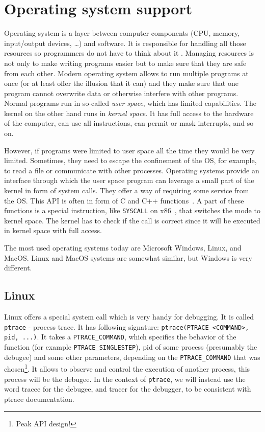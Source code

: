 \section{Operating system support}
Operating system is a layer between computer components (CPU, memory,
input/output devices, \dots) and software. It is responsible for handling all
those resources so programmers do not have to think about it \cite{modern-os,
os-concepts}. Managing resources is not only to make writing programs easier
but to make sure that they are safe from each other. Modern operating system
allows to run multiple programs at once (or at least offer the illusion that it
can) and they make sure that one program cannot overwrite data or otherwise
interfere with other programs. Normal programs run in so-called \textit{user
space}, which has limited capabilities. The kernel on the other hand runs in
\textit{kernel space}. It has full access to the hardware of the computer, can
use all instructions, can permit or mask interrupts, and so on.

However, if programs were limited to user space all the time they would be very
limited. Sometimes, they need to escape the confinement of the OS, for example,
to read a file or communicate with other processes. Operating systems provide
an interface through which the user space program can leverage a small part of
the kernel in form of system calls. They offer a way of requiring some service
from the OS. This API is often in form of C and C++
functions~\cite{os-concepts}. A part of these functions is a special
instruction, like \texttt{SYSCALL} on x86~\cite{intel-manual}, that switches
the mode to kernel space. The kernel has to check if the call is correct since
it will be executed in kernel space with full access.

The most used operating systems today are Microsoft Windows, Linux, and MacOS.
Linux and MacOS systems are somewhat similar, but Windows is very different.

\subsection{Linux}
Linux offers a special system call which is very handy for debugging. It is
called \texttt{ptrace} \cite{ptrace} - process trace. It has following
signature: \texttt{ptrace(PTRACE\_<COMMAND>, pid, ...)}. It takes a
\texttt{PTRACE\_COMMAND}, which specifies the behavior of the function (for
example \texttt{PTRACE\_SINGLESTEP}), pid of some process (presumably the
debugee) and some other parameters, depending on the \texttt{PTRACE\_COMMAND}
that was chosen\footnote{Peak API design!}. It allows to observe and control
the execution of another process, this process will be the debugee. In the
context of \texttt{ptrace}, we will instead use the word tracee for the
debugee, and tracer for the debugger, to be consistent with ptrace
documentation.

